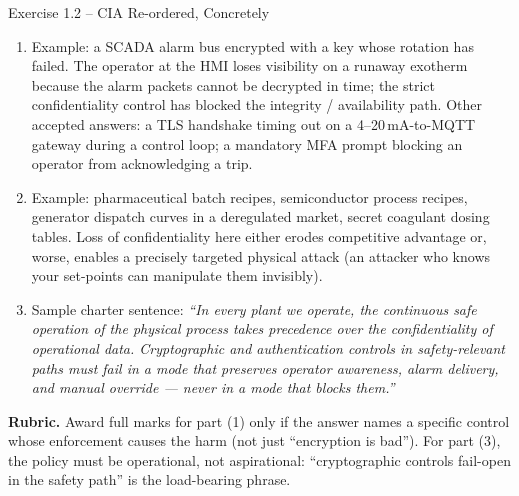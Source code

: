 \documentclass[11pt,a4paper]{article}
\begin{document}
\begin{solutionbox}{Exercise 1.2 -- CIA Re-ordered, Concretely}
\begin{enumerate}
  \item Example: a SCADA alarm bus encrypted with a key whose rotation has failed. The operator at the HMI loses visibility on a runaway exotherm because the alarm packets cannot be decrypted in time; the strict confidentiality control has blocked the integrity / availability path. Other accepted answers: a TLS handshake timing out on a 4--20\,mA-to-MQTT gateway during a control loop; a mandatory MFA prompt blocking an operator from acknowledging a trip.
  \item Example: pharmaceutical batch recipes, semiconductor process recipes, generator dispatch curves in a deregulated market, secret coagulant dosing tables. Loss of confidentiality here either erodes competitive advantage or, worse, enables a precisely targeted physical attack (an attacker who knows your set-points can manipulate them invisibly).
  \item Sample charter sentence: \emph{``In every plant we operate, the continuous safe operation of the physical process takes precedence over the confidentiality of operational data. Cryptographic and authentication controls in safety-relevant paths must fail in a mode that preserves operator awareness, alarm delivery, and manual override --- never in a mode that blocks them.''}
\end{enumerate}

\textbf{Rubric.} Award full marks for part (1) only if the answer names a specific control whose enforcement causes the harm (not just ``encryption is bad''). For part (3), the policy must be operational, not aspirational: ``cryptographic controls fail-open in the safety path'' is the load-bearing phrase.
\end{solutionbox}
\end{document}

